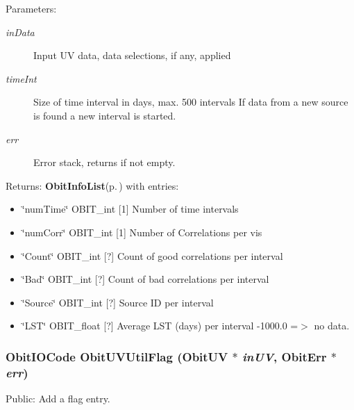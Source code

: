 \begin{Desc}
\item[Parameters:]
\begin{description}
\item[{\em in\-Data}]Input UV data, data selections, if any, applied \item[{\em time\-Int}]Size of time interval in days, max. 500 intervals If data from a new source is found a new interval is started. \item[{\em err}]Error stack, returns if not empty. \end{description}
\end{Desc}
\begin{Desc}
\item[Returns:]{\bf Obit\-Info\-List}{\rm (p.\,\pageref{structObitInfoList})} with entries: \begin{itemize}
\item \char`\"{}num\-Time\char`\"{} OBIT\_\-int [1] Number of time intervals \item \char`\"{}num\-Corr\char`\"{} OBIT\_\-int [1] Number of Correlations per vis \item \char`\"{}Count\char`\"{} OBIT\_\-int [?] Count of good correlations per interval \item \char`\"{}Bad\char`\"{} OBIT\_\-int [?] Count of bad correlations per interval \item \char`\"{}Source\char`\"{} OBIT\_\-int [?] Source ID per interval \item \char`\"{}LST\char`\"{} OBIT\_\-float [?] Average LST (days) per interval -1000.0 =$>$ no data. \end{itemize}
\end{Desc}
\subsubsection{\setlength{\rightskip}{0pt plus 5cm}Obit\-IOCode Obit\-UVUtil\-Flag ({\bf Obit\-UV} $\ast$ {\em in\-UV}, {\bf Obit\-Err} $\ast$ {\em err})}\label{ObitUVUtil_8h_a12}


Public: Add a flag entry. 

